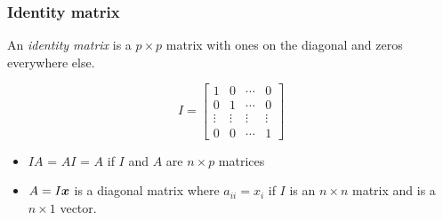 \documentclass{beamer}
\begin{document}


\begin{frame}
  \frametitle{Identity matrix}

An \emph{identity matrix} is a $p \times p$ matrix with ones on the diagonal and zeros everywhere else.

\[
I = \left[ \begin{array}{cccc}

1 & 0 & \cdots & 0 \\
0 & 1 & \cdots & 0 \\
\vdots & \vdots & \vdots & \vdots \\
0 & 0 & \cdots & 1
\end{array}
\right]
\]

\begin{itemize}
 \item $IA$ = $AI$ = $A$ if $I$ and $A$ are  $n \times p$ matrices
 \item $A = I\bm{x}$ is a diagonal matrix where $a_{ii} = x_i$ if $I$ is an $n \times n$ matrix and  is a $n \times 1$ vector.

\end{itemize}


\end{frame}
\end{document}
